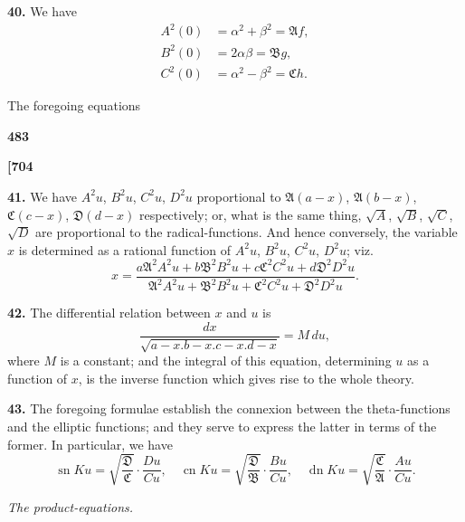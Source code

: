 \documentclass[12pt,a4paper]{article}
\DeclareMathOperator{\sn}{sn}
\DeclareMathOperator{\cn}{cn}
\DeclareMathOperator{\dn}{dn}
\theoremstyle{definition}
\begin{document}
\noindent\textbf{40.}\quad
We have
\begin{align*}
A^2(0) &= \alpha^2 + \beta^2 = \mathfrak{A}f, \\
B^2(0) &= 2\alpha\beta = \mathfrak{B}g, \\
C^2(0) &= \alpha^2 - \beta^2 = \mathfrak{C}h.
\end{align*}

The foregoing equations

\vspace{1em}

\begin{center}
\textbf{483}
\end{center}

\vspace{0.5em}

\noindent\textbf{[704}

\vspace{0.5em}

\noindent\textbf{41.}\quad
We have $A^2 u$, $B^2 u$, $C^2 u$, $D^2 u$ proportional to $\mathfrak{A}(a - x)$, $\mathfrak{A}(b - x)$, $\mathfrak{C}(c - x)$, $\mathfrak{D}(d - x)$ respectively; or, what is the same thing, $\sqrt{A}$, $\sqrt{B}$, $\sqrt{C}$, $\sqrt{D}$ are proportional to the radical-functions. And hence conversely, the variable $x$ is determined as a rational function of $A^2 u$, $B^2 u$, $C^2 u$, $D^2 u$; viz.
\[
x = \frac{a\mathfrak{A}^2 A^2 u + b\mathfrak{B}^2 B^2 u + c\mathfrak{C}^2 C^2 u + d\mathfrak{D}^2 D^2 u}{\mathfrak{A}^2 A^2 u + \mathfrak{B}^2 B^2 u + \mathfrak{C}^2 C^2 u + \mathfrak{D}^2 D^2 u}.
\]

\noindent\textbf{42.}\quad
The differential relation between $x$ and $u$ is
\[
\frac{dx}{\sqrt{a - x . b - x . c - x . d - x}} = M\, du,
\]
where $M$ is a constant; and the integral of this equation, determining $u$ as a function of $x$, is the inverse function which gives rise to the whole theory.

\noindent\textbf{43.}\quad
The foregoing formulae establish the connexion between the theta-functions and the elliptic functions; and they serve to express the latter in terms of the former. In particular, we have
\[
\sn Ku = \sqrt{\frac{\mathfrak{D}}{\mathfrak{C}}} \cdot \frac{Du}{Cu},\quad
\cn Ku = \sqrt{\frac{\mathfrak{D}}{\mathfrak{B}}} \cdot \frac{Bu}{Cu},\quad
\dn Ku = \sqrt{\frac{\mathfrak{C}}{\mathfrak{A}}} \cdot \frac{Au}{Cu}.
\]

\vspace{1em}

\begin{center}
\textit{The product-equations.}
\end{center}
\end{document}
